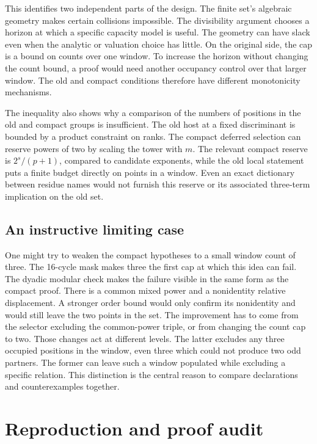 \documentclass[12pt,letterpaper]{article}
\begin{document}
This identifies two independent parts of the design. The finite set's algebraic geometry makes certain collisions impossible. The divisibility argument chooses a horizon at which a specific capacity model is useful. The geometry can have slack even when the analytic or valuation choice has little. On the original side, the cap is a bound on counts over one window. To increase the horizon without changing the count bound, a proof would need another occupancy control over that larger window. The old and compact conditions therefore have different monotonicity mechanisms.

The inequality also shows why a comparison of the numbers of positions in the old and compact groups is insufficient. The old host at a fixed discriminant is bounded by a product constraint on ranks. The compact deferred selection can reserve powers of two by scaling the tower with \(m\). The relevant compact reserve is \(2^s/(p+1)\), compared to candidate exponents, while the old local statement puts a finite budget directly on points in a window. Even an exact dictionary between residue names would not furnish this reserve or its associated three-term implication on the old set.

\subsection{An instructive limiting case}

One might try to weaken the compact hypotheses to a small window count of three. The 16-cycle mask makes three the first cap at which this idea can fail. The dyadic modular check makes the failure visible in the same form as the compact proof. There is a common mixed power and a nonidentity relative displacement. A stronger order bound would only confirm its nonidentity and would still leave the two points in the set. The improvement has to come from the selector excluding the common-power triple, or from changing the count cap to two. Those changes act at different levels. The latter excludes any three occupied positions in the window, even three which could not produce two odd partners. The former can leave such a window populated while excluding a specific relation. This distinction is the central reason to compare declarations and counterexamples together.

\section{Reproduction and proof audit}
\end{document}
